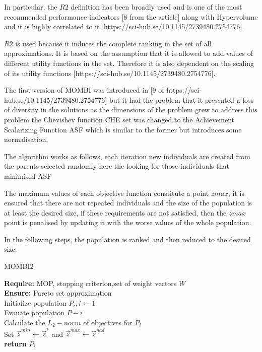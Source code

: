 In particular, the $R2$ definition has been broadly used and is one of the most recommended performance indicators [8 from the article] along with Hypervolume and it is highly correlated to it [https://sci-hub.se/10.1145/2739480.2754776].

$R2$ is used because it induces the complete ranking in the set of all approximations. It is based on the assumption that it is allowed to add values of different utility functions in the set. Therefore it is also dependent on the scaling of its utility functions [https://sci-hub.se/10.1145/2739480.2754776].

The first version of MOMBI was introduced in [9 of https://sci-hub.se/10.1145/2739480.2754776] but it had the problem that it presented a loss of diversity in the solutions as the dimensions of the problem grew to address this problem the Chevishev function CHE set was changed to  the Achievement Scalarizing Function ASF which is similar to the former but introduces some normalisation.

The algorithm works as follows, each iteration new individuals are created from the parents selected randomly  here the looking for those individuals that minimised ASF

The maximum values of each objective function constitute a point $zmax$, it is ensured that there are not repeated individuals and the size of the population is at least the desired size, if these requirements are not satisfied, then the $zmax$ point is penalised by updating it with the worse values of the whole population.

In the following steps, the population is ranked and then reduced to the desired size.

\begin{algorithm}[H]
\label{mombi2_alg}
\caption{MOMBI2}
\SetAlgoLined
\textbf{Require:} MOP, stopping criterion,set of weight vectors $W$\;\\
\textbf{Ensure:} Pareto set approximation\;\\
Initialize population $P_i,i \gets 1$\;\\
Evauate population $P-i$\;\\
Calculate the $L_2-norm$ of objectives for $P_i$\;\\
Set $\vec z^{min} \gets \vec z^*$ and $\vec z^{max} \gets \vec z^{nad}$\;\\
\textbf{return} $P_i$
\end{algorithm}

